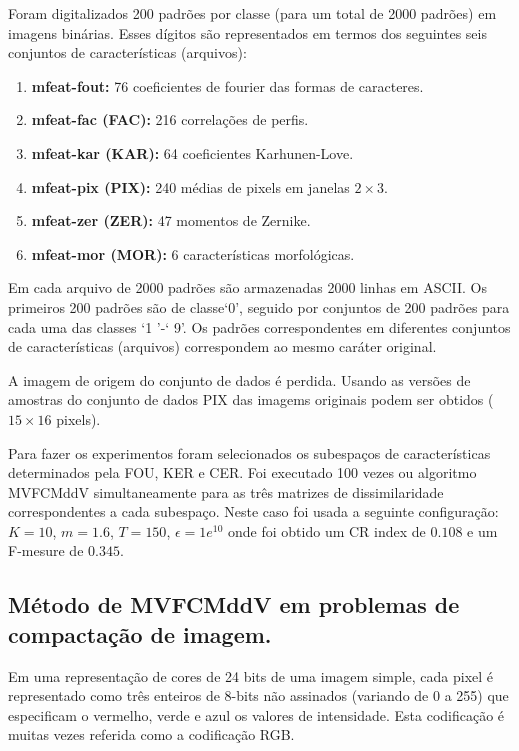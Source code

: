 \documentclass[12pt]{article}
\begin{document}
Foram digitalizados 200 padrões por classe (para um total de 2000 padrões) em imagens binárias. Esses dígitos são representados em termos dos seguintes seis conjuntos de características (arquivos):

\begin{enumerate}
\item \textbf{mfeat-fout:} 76 coeficientes de fourier das formas de caracteres.
\item \textbf{mfeat-fac (FAC):} 216 correlações de perfis.
\item \textbf{mfeat-kar (KAR):} 64 coeficientes Karhunen-Love.
\item \textbf{mfeat-pix (PIX):} 240 médias de pixels em janelas $ 2 \times 3 $.
\item \textbf{mfeat-zer (ZER):} 47 momentos de Zernike.
\item \textbf{mfeat-mor (MOR):} 6 características morfológicas.
\end{enumerate}

Em cada arquivo de 2000 padrões são armazenadas 2000 linhas em ASCII. Os primeiros 200 padrões são de classe`0', seguido por conjuntos de 200 padrões para cada uma das classes `1 '-` 9'. Os padrões correspondentes em diferentes conjuntos de características (arquivos) correspondem ao mesmo caráter original.

A imagem de origem do conjunto de dados é perdida.
Usando as versões de amostras  do conjunto de dados PIX das imagems originais podem ser obtidos ($15 \times 16$ pixels).

Para fazer os experimentos foram selecionados os subespaços de características determinados pela FOU, KER e CER. Foi executado 100 vezes ou algoritmo MVFCMddV simultaneamente para as três matrizes de dissimilaridade correspondentes a cada subespaço. Neste caso foi usada a seguinte configuração: $K =10$, $m = 1.6$, $T = 150$, $\epsilon = 1e^{10}$ onde foi obtido um CR index de $0.108$ e um F-mesure de $0.345$. 

\subsection{Método de MVFCMddV em problemas de compactação de imagem.}

Em uma representação de cores de 24 bits de uma imagem simple, cada pixel é representado como três enteiros de 8-bits não assinados (variando de 0 a 255) que especificam o vermelho, verde e azul os valores de intensidade. Esta codificação é muitas vezes referida como a codificação RGB.
\end{document}
